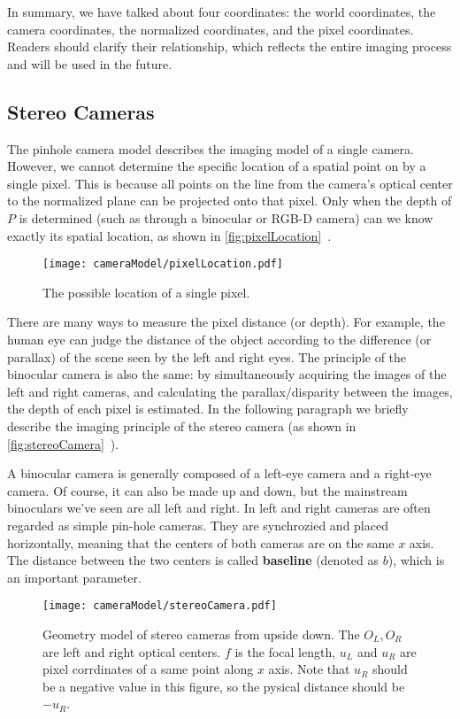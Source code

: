 In summary, we have talked about four coordinates: the world coordinates, the camera coordinates, the normalized coordinates, and the pixel coordinates. Readers should clarify their relationship, which reflects the entire imaging process and will be used in the future.

\subsection{Stereo Cameras}
The pinhole camera model describes the imaging model of a single camera. However, we cannot determine the specific location of a spatial point on by a single pixel. This is because all points on the line from the camera's optical center to the normalized plane can be projected onto that pixel. Only when the depth of $P$ is determined (such as through a binocular or RGB-D camera) can we know exactly its spatial location, as shown in \autoref {fig:pixelLocation}~.

\begin{figure}[!ht]
    \centering
    \texttt{[image: cameraModel/pixelLocation.pdf]}
    \caption{The possible location of a single pixel.}
    \label{fig:pixelLocation}
\end{figure}

There are many ways to measure the pixel distance (or depth). For example, the human eye can judge the distance of the object according to the difference (or parallax) of the scene seen by the left and right eyes. The principle of the binocular camera is also the same: by simultaneously acquiring the images of the left and right cameras, and calculating the parallax/disparity between the images, the depth of each pixel is estimated. In the following paragraph we  briefly describe the imaging principle of the stereo camera (as shown in \autoref{fig:stereoCamera}~).

A binocular camera is generally composed of a left-eye camera and a right-eye camera. Of course, it can also be made up and down, but the mainstream binoculars we've seen are all left and right. In left and right cameras are often regarded as simple pin-hole cameras. They are synchrozied and placed horizontally, meaning that the centers of both cameras are on the same $x$ axis. The distance between the two centers is called \textbf {baseline} (denoted as $b$), which is an important parameter.

\begin{figure}[!ht]
    \centering
    \texttt{[image: cameraModel/stereoCamera.pdf]}
    \caption{Geometry model of stereo cameras from upside down. The $O_L,O_R$ are left and right optical centers. $f$ is the focal length, $u_L$ and $u_R$ are pixel corrdinates of a same point along $x$ axis. Note that $u_R$ should be a negative value in this figure, so the pysical distance should be $-u_R$.}
    \label{fig:stereoCamera}
\end{figure}

